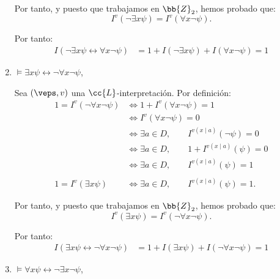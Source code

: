 \begin{ejercicio}
\begin{enumerate}
        Por tanto, y puesto que trabajamos en $\bb{Z}_2$, hemos probado que:
        \begin{equation*}
            I^v(\neg \exists x \psi) =I^v(\forall x \neg \psi).
        \end{equation*}

        Por tanto:
        \begin{align*}
            I( \neg \exists x \psi \leftrightarrow \forall x \neg \psi)
            &= 1+I(\neg \exists x \psi)+I(\forall x \neg \psi)=1
        \end{align*}
        \item $\models \exists x \psi \leftrightarrow \neg \forall x \neg \psi$,
        
        Sea $(\veps,v)$ una $\cc{L}$-interpretación. Por definición:
        \begin{align*}
            1 = I^v(\neg \forall x \neg \psi)
            &\iff 1+I^v(\forall x \neg \psi) = 1\\
            &\iff I^{v}( \forall x \neg \psi) = 0\\
            &\iff \exists a\in D,\qquad I^{v(x\mid a)}(\neg \psi) = 0\\
            &\iff \exists a\in D,\qquad 1+I^{v(x\mid a)}(\psi) = 0\\
            &\iff \exists a\in D,\qquad I^{v(x\mid a)}(\psi) = 1\\\\
            1 = I^v(\exists x \psi)
            &\iff \exists a\in D,\qquad I^{v(x\mid a)}(\psi) = 1.
        \end{align*}

        Por tanto, y puesto que trabajamos en $\bb{Z}_2$, hemos probado que:
        \begin{equation*}
            I^v(\exists x \psi) =I^v(\neg \forall x \neg \psi).
        \end{equation*}

        Por tanto:
        \begin{align*}
            I( \exists x \psi \leftrightarrow \neg \forall x \neg \psi)
            &= 1+I(\exists x \psi)+I(\neg \forall x \neg \psi)=1
        \end{align*}
        \item $\models \forall x \psi \leftrightarrow \neg \exists x \neg \psi$,
        

\end{enumerate}
\end{ejercicio}
